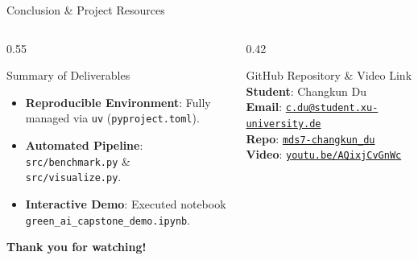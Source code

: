 \documentclass[aspectratio=169, 10pt]{beamer}
\begin{document}
\begin{frame}{Conclusion \& Project Resources}
    \begin{columns}
        \begin{column}{0.55\textwidth}
            \begin{block}{Summary of Deliverables}
                \begin{itemize}
                    \item \textbf{Reproducible Environment}: Fully managed via \texttt{uv} (\texttt{pyproject.toml}).
                    \item \textbf{Automated Pipeline}: \texttt{src/benchmark.py} \& \texttt{src/visualize.py}.
                    \item \textbf{Interactive Demo}: Executed notebook \texttt{green\_ai\_capstone\_demo.ipynb}.
                \end{itemize}
            \end{block}
            
            \vspace{0.2cm}
            \centering
            \textbf{Thank you for watching!}
        \end{column}
        
        \begin{column}{0.42\textwidth}
            \begin{alertblock}{GitHub Repository \& Video Link}
                \small
                \textbf{Student}: Changkun Du\\
                \textbf{Email}: \href{mailto:c.du@student.xu-university.de}{\texttt{c.du@student.xu-university.de}}\\
                \textbf{Repo}: \href{https://github.com/c-du/mds7-changkun_du}{\texttt{mds7-changkun\_du}}\\
                \textbf{Video}: \href{https://youtu.be/AQixjCvGnWc}{\texttt{youtu.be/AQixjCvGnWc}}
            \end{alertblock}
        \end{column}
    \end{columns}
\end{frame}
\end{document}
